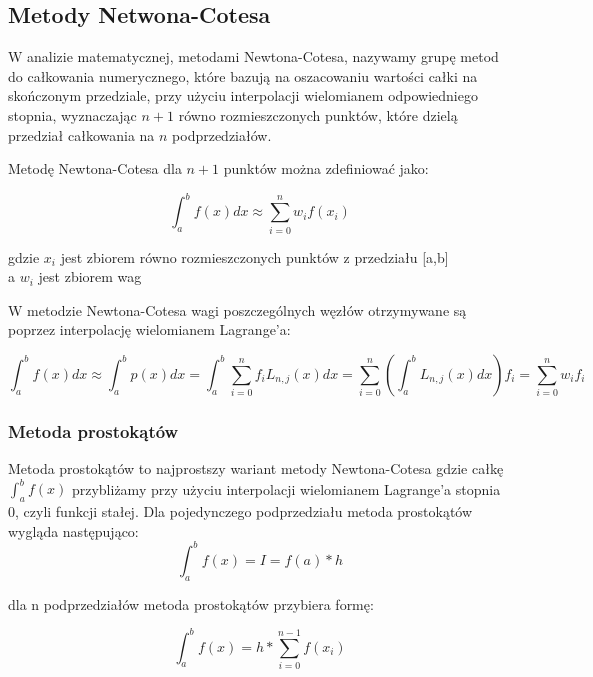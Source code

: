 \documentclass[12pt,twoside]{article}
\begin{document}
\subsection{Metody Netwona-Cotesa}

W analizie matematycznej, metodami Newtona-Cotesa, nazywamy grupę metod do całkowania numerycznego, które bazują na oszacowaniu wartości całki na skończonym przedziale, przy użyciu interpolacji wielomianem odpowiedniego stopnia, wyznaczając $n+1$ równo rozmieszczonych punktów, które dzielą przedział całkowania na $n$ podprzedziałów\cite{wikipedia}.

Metodę Newtona-Cotesa dla $n+1$ punktów  można zdefiniować jako:

\begin{equation}
\int_a^b f(x)dx \approx \sum_{i=0}^n w_i f(x_i)
\label{Eq:rownanie}
\end{equation}


gdzie 
$x_i$ jest zbiorem równo rozmieszczonych punktów z przedziału [a,b]\\
a $w_i$ jest zbiorem wag


W metodzie Newtona-Cotesa wagi poszczególnych węzłów otrzymywane są poprzez interpolację wielomianem Lagrange'a\cite{web}:

\begin{equation}
\int_a^b f(x) dx \approx \int_a^b p(x) dx = \int_a^b \sum_{i=0}^{n} f_i L_{n,j}(x) dx = \sum_{i=0}^{n}(\int_a^b L_{n,j}(x)dx)f_i = \sum_{i=0}^{n} w_i f_i 
\label{Eq:rownanie}
\end{equation}

\clearpage	

\subsubsection{Metoda prostokątów}

Metoda prostokątów to najprostszy wariant metody Newtona-Cotesa gdzie całkę $\int_a^b f(x)$ przybliżamy przy użyciu interpolacji wielomianem Lagrange'a stopnia 0, czyli funkcji stałej.
Dla pojedynczego podprzedziału metoda prostokątów wygląda następująco:
\begin{equation}
\int_a^b f(x) = I = f(a)*h
\label{Eq:rownanie}
\end{equation}

dla n podprzedziałów metoda prostokątów przybiera formę:

\begin{equation}
\int_a^b f(x) = h * \sum_{i=0}^{n-1}f(x_i)
\label{Eq:rownanie}
\end{equation}
\end{document}
